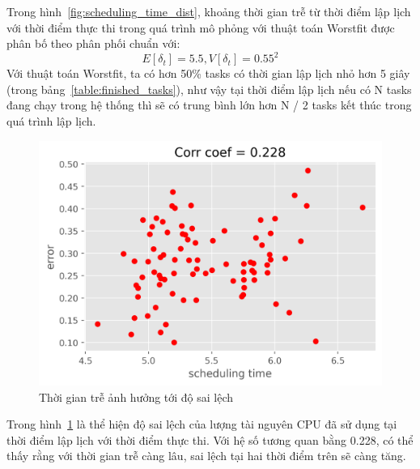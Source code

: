 \documentclass{my_style}
\begin{document}
\noindent
Trong hình~\ref{fig:scheduling_time_dist}, khoảng thời gian trễ từ thời điểm lập lịch với thời điểm thực thi trong quá trình mô phỏng với thuật toán Worstfit được phân bố theo phân phối chuẩn với: 
\[
	E[\delta_{t}] = 5.5 , V[\delta_{t}] = 0.55^{2}
\]
Với thuật toán Worstfit, ta có hơn 50\% tasks có thời gian lập lịch nhỏ hơn 5 giây (trong bảng~\ref{table:finished_tasks}), như vậy tại thời điểm lập lịch nếu có N tasks đang chạy trong hệ thống thì sẽ có trung bình lớn hơn N / 2 tasks kết thúc trong quá trình lập lịch. \\
\begin{figure}[h!]
	\centering
	\includegraphics[scale=0.8]{images/scheduling_time_vs_delta.png}
	\caption{Thời gian trễ ảnh hưởng tới độ sai lệch}
	\label{fig:time_vs_error}
\end{figure}

\noindent
Trong hình~\ref{fig:time_vs_error} là thể hiện độ sai lệch của lượng tài nguyên CPU đã sử dụng tại thời điểm lập lịch với thời điểm thực thi. Với hệ số tương quan bằng 0.228, có thể thấy rằng với thời gian trễ càng lâu, sai lệch tại hai thời điểm trên sẽ càng tăng. \\
\end{document}
